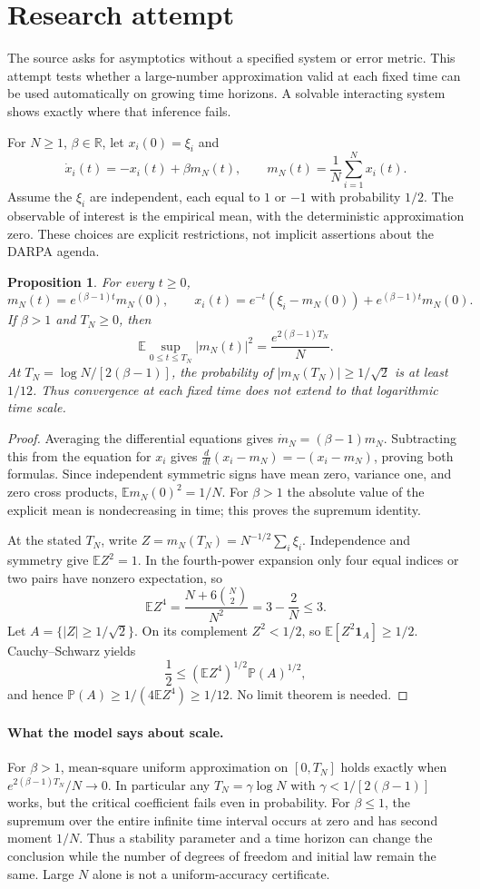 \documentclass[11pt]{article}
\newtheorem{proposition}{Proposition}
\begin{document}
\section{Research attempt}
The source asks for asymptotics without a specified system or error metric. This attempt tests whether a large-number approximation valid at each fixed time can be used automatically on growing time horizons. A solvable interacting system shows exactly where that inference fails.

For $N\ge1$, $\beta\in\mathbb R$, let $x_i(0)=\xi_i$ and
\[
 \dot x_i(t)=-x_i(t)+\beta m_N(t),\qquad
 m_N(t)=\frac1N\sum_{i=1}^Nx_i(t).
\]
Assume the $\xi_i$ are independent, each equal to $1$ or $-1$ with probability $1/2$. The observable of interest is the empirical mean, with the deterministic approximation zero. These choices are explicit restrictions, not implicit assertions about the DARPA agenda.

\begin{proposition}
For every $t\ge0$,
\[
 m_N(t)=e^{(\beta-1)t}m_N(0),\qquad
 x_i(t)=e^{-t}(\xi_i-m_N(0))+e^{(\beta-1)t}m_N(0).
\]
If $\beta>1$ and $T_N\ge0$, then
\[
 \mathbb E\sup_{0\le t\le T_N}|m_N(t)|^2
       =\frac{e^{2(\beta-1)T_N}}N.
\]
At $T_N=\log N/[2(\beta-1)]$, the probability of $|m_N(T_N)|\ge1/\sqrt2$ is at least $1/12$. Thus convergence at each fixed time does not extend to that logarithmic time scale.
\end{proposition}
\begin{proof}
Averaging the differential equations gives $\dot m_N=(\beta-1)m_N$. Subtracting this from the equation for $x_i$ gives $\frac d{dt}(x_i-m_N)=-(x_i-m_N)$, proving both formulas. Since independent symmetric signs have mean zero, variance one, and zero cross products, $\mathbb E m_N(0)^2=1/N$. For $\beta>1$ the absolute value of the explicit mean is nondecreasing in time; this proves the supremum identity.

At the stated $T_N$, write $Z=m_N(T_N)=N^{-1/2}\sum_i\xi_i$. Independence and symmetry give $\mathbb EZ^2=1$. In the fourth-power expansion only four equal indices or two pairs have nonzero expectation, so
\[
 \mathbb EZ^4=\frac{N+6\binom N2}{N^2}=3-\frac2N\le3.
\]
Let $A=\{|Z|\ge1/\sqrt2\}$. On its complement $Z^2<1/2$, so $\mathbb E[Z^2\mathbf1_A]\ge1/2$. Cauchy--Schwarz yields
\[
 \frac12\le (\mathbb EZ^4)^{1/2}\mathbb P(A)^{1/2},
\]
and hence $\mathbb P(A)\ge1/(4\mathbb EZ^4)\ge1/12$. No limit theorem is needed.
\end{proof}

\paragraph{What the model says about scale.}
For $\beta>1$, mean-square uniform approximation on $[0,T_N]$ holds exactly when $e^{2(\beta-1)T_N}/N\to0$. In particular any $T_N=\gamma\log N$ with $\gamma<1/[2(\beta-1)]$ works, but the critical coefficient fails even in probability. For $\beta\le1$, the supremum over the entire infinite time interval occurs at zero and has second moment $1/N$. Thus a stability parameter and a time horizon can change the conclusion while the number of degrees of freedom and initial law remain the same. Large $N$ alone is not a uniform-accuracy certificate.
\end{document}
